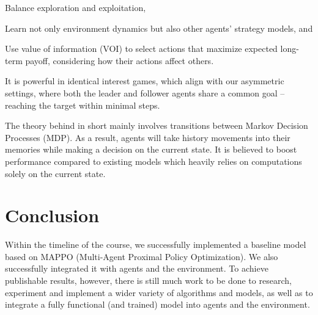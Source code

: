 \documentclass[a4paper,11pt]{article}
\begin{document}
    Balance exploration and exploitation, 

    Learn not only environment dynamics but also other agents’ strategy models, and 

    Use value of information (VOI) to select actions that maximize expected long-term payoff, considering how their actions affect others. 

It is powerful in identical interest games, which align with our asymmetric settings, where both the leader and follower agents share a common goal – reaching the target within minimal steps.  

The theory behind in short mainly involves transitions between Markov Decision Processes (MDP). As a result, agents will take history movements into their memories while making a decision on the current state. It is believed to boost performance compared to existing models which heavily relies on computations solely on the current state.

\section{Conclusion}
Within the timeline of the course, we successfully implemented a baseline model based on MAPPO (Multi-Agent Proximal Policy Optimization). We also successfully integrated it with agents and the environment. To achieve publishable results, however, there is still much work to be done to research, experiment and implement a wider variety of algorithms and models, as well as to integrate a fully functional (and trained) model into agents and the environment. 
\end{document}
